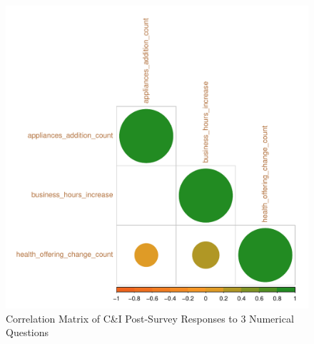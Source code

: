 \begin{figure}
    \centering
    \includegraphics[width=\textwidth]{images/ci_post_corr_plot.pdf}
    \caption{Correlation Matrix of C\&I Post-Survey Responses to 3 Numerical Questions}
    \label{fig:corr-post-ci}
\end{figure}

